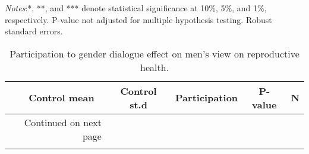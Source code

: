\documentclass[10pt,a4paper, margin=1in]{article}
\begin{document}
\begin{center}
	{\tiny \tabcolsep=1pt  %
		\begin{ThreePartTable}
			\begin{TableNotes}[flushleft]
				\tiny
				\item \textit{Notes}:*, **, and *** denote statistical significance at 10\%, 5\%, and 1\%, respectively. P-value not adjusted for multiple hypothesis testing. Robust standard errors.
			\end{TableNotes}
			\begin{longtable}{l*{5}{c}}
				\caption{Participation to gender dialogue effect on men's view on reproductive health.}\label{tab:balance_omni}					\\
				\toprule
				\hline 
				&\multicolumn{1}{p{1cm}}{\centering Control mean}
				&\multicolumn{1}{p{1cm}}{\centering Control st.d}
				&\multicolumn{1}{p{2cm}}{\centering Participation}
				&\multicolumn{1}{p{1cm}}{\centering P-value}
				&\multicolumn{1}{p{1cm}}{\centering N} \\
				\hline 
				\endfirsthead
				\hline
				\endhead
				\hline
				\multicolumn{2}{r}{{Continued on next page}} \\
				\endfoot
				
				\bottomrule
				\insertTableNotes
				\endlastfoot
				
			\end{longtable}
		\end{ThreePartTable}
	}
\end{center}
\end{document}
